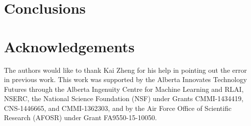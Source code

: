 \documentclass[twoside, 11pt]{article}
\begin{document}
\section{Conclusions}
\label{sec:conc}


\appendix




\section*{Acknowledgements}
The authors would like to thank Kai Zheng for his help in pointing out the error in previous work.
This work was supported by the Alberta Innovates Technology Futures through the Alberta Ingenuity Centre for Machine Learning and RLAI, NSERC, the National Science Foundation (NSF) under Grants CMMI-1434419, CNS-1446665, and CMMI-1362303, and by the Air Force Office of Scientific Research (AFOSR) under Grant FA9550-15-10050.

%


\end{document}
